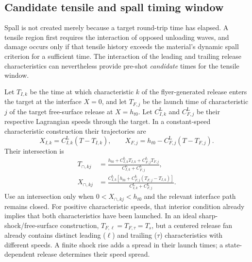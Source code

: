 \documentclass[11pt]{article}
\begin{document}
\subsection{Candidate tensile and spall timing window}
\label{sec:spall-window}

Spall is not created merely because a target round-trip time has elapsed.  A
tensile region first requires the interaction of opposed unloading waves, and
damage occurs only if that tensile history exceeds the material's dynamic
spall criterion for a sufficient time.  The interaction of the leading and
trailing release characteristics can nevertheless provide pre-shot
\emph{candidate} times for the tensile window.

Let $T_{I,k}$ be the time at which characteristic $k$ of the flyer-generated
release enters the target at the interface $X=0$, and let $T_{F,j}$ be the
launch time of characteristic $j$ of the target free-surface release at
$X=h_{t0}$.  Let $C_{I,k}^{\mathrm L}$ and $C_{F,j}^{\mathrm L}$ be their
respective Lagrangian speeds through the target.  In a constant-speed
characteristic construction their trajectories are
\begin{equation}
  X_{I,k}=C_{I,k}^{\mathrm L}(T-T_{I,k}),\qquad
  X_{F,j}=h_{t0}-C_{F,j}^{\mathrm L}(T-T_{F,j}).
  \label{eq:opposed-release-rays}
\end{equation}
Their intersection is
\begin{align}
  T_{\cap,kj}
  &=\frac{h_{t0}+C_{I,k}^{\mathrm L}T_{I,k}
      +C_{F,j}^{\mathrm L}T_{F,j}}
      {C_{I,k}^{\mathrm L}+C_{F,j}^{\mathrm L}}, \\
  X_{\cap,kj}
  &=\frac{C_{I,k}^{\mathrm L}
      [h_{t0}+C_{F,j}^{\mathrm L}(T_{F,j}-T_{I,k})]}
      {C_{I,k}^{\mathrm L}+C_{F,j}^{\mathrm L}}.
  \label{eq:opposed-release-intersection}
\end{align}
Use an intersection only when $0<X_{\cap,kj}<h_{t0}$ and the relevant
interface path remains closed.  For positive characteristic speeds, that
interior condition already implies that both characteristics have been
launched.  In an ideal sharp-shock/free-surface construction,
$T_{F,\ell}=T_{F,\tau}=T_s$, but a centered release fan already contains
distinct leading ($\ell$) and trailing ($\tau$) characteristics with
different speeds.  A finite shock rise adds a spread in their launch times;
a state-dependent release determines their speed spread.
\end{document}
